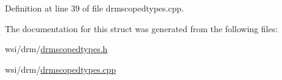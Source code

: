 Definition at line 39 of file drmscopedtypes.\+cpp.


\begin{DoxyCode}{0}
\end{DoxyCode}


The documentation for this struct was generated from the following files\+:\begin{DoxyCompactItemize}
\item 
wsi/drm/\mbox{\hyperlink{drmscopedtypes_8h}{drmscopedtypes.\+h}}\item 
wsi/drm/\mbox{\hyperlink{drmscopedtypes_8cpp}{drmscopedtypes.\+cpp}}\end{DoxyCompactItemize}

